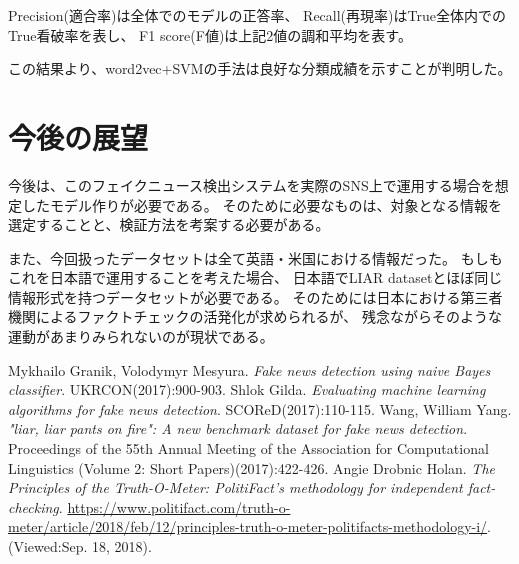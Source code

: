 \documentclass[twocolumn, a4paper, uplatex]{UECIEresume}
\begin{document}
Precision(適合率)は全体でのモデルの正答率、
Recall(再現率)はTrue全体内でのTrue看破率を表し、
F1 score(F値)は上記2値の調和平均を表す。

この結果より、word2vec+SVMの手法は良好な分類成績を示すことが判明した。

\section{今後の展望}
今後は、このフェイクニュース検出システムを実際のSNS上で運用する場合を想定したモデル作りが必要である。
そのために必要なものは、対象となる情報を選定することと、検証方法を考案する必要がある。

また、今回扱ったデータセットは全て英語・米国における情報だった。
もしもこれを日本語で運用することを考えた場合、
日本語でLIAR datasetとほぼ同じ情報形式を持つデータセットが必要である。
そのためには日本における第三者機関によるファクトチェックの活発化が求められるが、
残念ながらそのような運動があまりみられないのが現状である。

{\small
\begin{thebibliography}{*}
  Mykhailo Granik, Volodymyr Mesyura. \textit{Fake news detection using naive Bayes classifier}. UKRCON(2017):900-903.
  Shlok Gilda. \textit{Evaluating machine learning algorithms for fake news detection}. SCOReD(2017):110-115.
  Wang, William Yang. \textit{"liar, liar pants on fire": A new benchmark dataset for fake news detection}. Proceedings of the 55th Annual Meeting of the Association for Computational Linguistics (Volume 2: Short Papers)(2017):422-426.
  Angie Drobnic Holan. \textit{The Principles of the Truth-O-Meter: PolitiFact’s methodology for independent fact-checking}. \url{https://www.politifact.com/truth-o-meter/article/2018/feb/12/principles-truth-o-meter-politifacts-methodology-i/}. (Viewed:Sep. 18, 2018).
\end{thebibliography}
}
\end{document}
